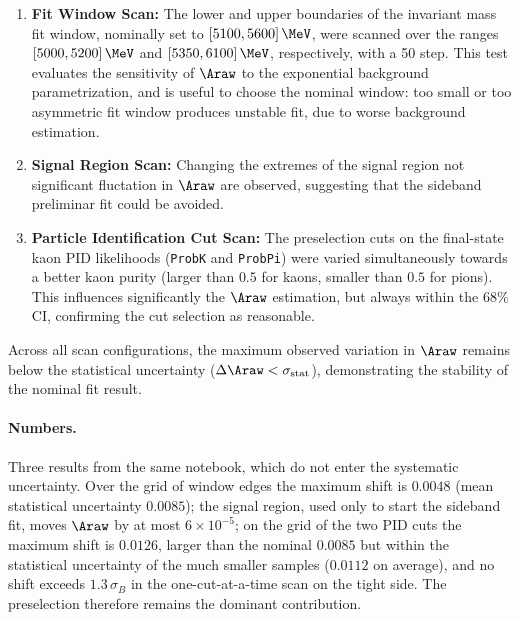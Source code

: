 \begin{enumerate}[leftmargin=*]
    \item \textbf{Fit Window Scan:} The lower and upper boundaries of the invariant mass fit window, nominally set to $[5100, 5600]\,\MeV$, were scanned over the ranges $[5000, 5200]\,\MeV$ and $[5350, 6100]\,\MeV$, respectively, with a 50 \MeV step. This test evaluates the sensitivity of $\Araw$ to the exponential background parametrization, and is useful to choose the nominal window: too small or too asymmetric fit window produces unstable fit, due to worse background estimation.

    \item \textbf{Signal Region Scan:} Changing the extremes of the signal region not significant fluctation in $\Araw$ are observed, suggesting that the sideband preliminar fit could be avoided.

    \item \textbf{Particle Identification Cut Scan:} The preselection cuts on the final-state kaon PID likelihoods (\texttt{ProbK} and \texttt{ProbPi}) were varied simultaneously towards a better kaon purity (larger than $0.5$ for kaons, smaller than $0.5$ for pions). This influences significantly the $\Araw$ estimation, but always within the $68\%$ CI, confirming the cut selection as reasonable.
\end{enumerate}

Across all scan configurations, the maximum observed variation in $\Araw$ remains below the statistical uncertainty ($\Delta \Araw < \sigma_{\mathrm{stat}}$), demonstrating the stability of the nominal fit result.

\paragraph*{Numbers.} Three results from the same notebook, which do not enter the systematic uncertainty. Over the grid of window edges the maximum shift is $0.0048$ (mean statistical uncertainty $0.0085$); the signal region, used only to start the sideband fit, moves $\Araw$ by at most $6\times10^{-5}$; on the grid of the two PID cuts the maximum shift is $0.0126$, larger than the nominal $0.0085$ but within the statistical uncertainty of the much smaller samples ($0.0112$ on average), and no shift exceeds $1.3\,\sigma_B$ in the one-cut-at-a-time scan on the tight side. The preselection therefore remains the dominant contribution.
